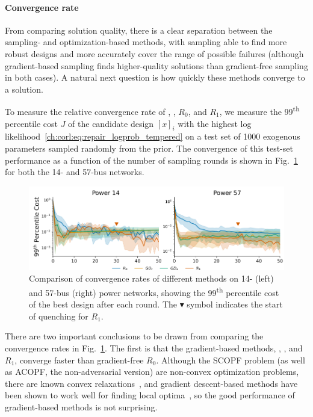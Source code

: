 \paragraph{Convergence rate} From comparing solution quality, there is a clear separation between the sampling- and optimization-based methods, with sampling able to find more robust designs and more accurately cover the range of possible failures (although gradient-based sampling finds higher-quality solutions than gradient-free sampling in both cases). A natural next question is how quickly these methods converge to a solution.

To measure the relative convergence rate of \gdr{}, \gda{}, $R_0$, and $R_1$, we measure the 99\textsuperscript{th} percentile cost $J$ of the candidate design $[x]_i$ with the highest log likelihood~\eqref{ch:corl:eq:repair_logprob_tempered} on a test set of 1000 exogenous parameters sampled randomly from the prior. The convergence of this test-set performance as a function of the number of sampling rounds is shown in Fig.~\ref{ch:corl:fig:power_training_curves} for both the 14- and 57-bus networks.

\begin{figure}[tb]
    \centering
    \includegraphics[width=\linewidth]{images/corl/power_convergence.png}
    \caption{Comparison of convergence rates of different methods on 14- (left) and 57-bus (right) power networks, showing the 99\textsuperscript{th} percentile cost of the best design after each round. The {\color{orange} $\blacktriangledown$} symbol indicates the start of quenching for $R_1$.}
    \label{ch:corl:fig:power_training_curves}
\end{figure}

There are two important conclusions to be drawn from comparing the convergence rates in Fig.~\ref{ch:corl:fig:power_training_curves}. The first is that the gradient-based methods, \gdr{}, \gda{}, and $R_1$, converge faster than gradient-free $R_0$. Although the SCOPF problem (as well as ACOPF, the non-adversarial version) are non-convex optimization problems, there are known convex relaxations~\cite{huangReviewConvexificationMethods2019}, and gradient descent-based methods have been shown to work well for finding local optima~\cite{dontiAdversariallyRobustLearning2021,dontiDC3LearningMethod2021}, so the good performance of gradient-based methods is not surprising.

